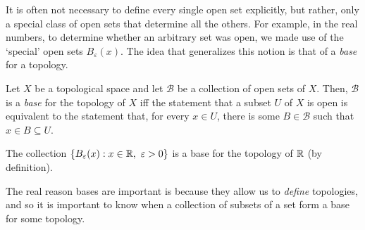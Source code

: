 It is often not necessary to define every single open set explicitly, but rather, only a special class of open sets that determine all the others.  For example, in the real numbers, to determine whether an arbitrary set was open, we made use of the `special' open sets $B_\varepsilon (x)$.  The idea that generalizes this notion is that of a \emph{base} for a topology.
\begin{dfn}[Base]\label{Base}
Let $X$ be a topological space and let $\mathcal{B}$ be a collection of open sets of $X$.  Then, $\mathcal{B}$ is a \emph{base} for the topology of $X$ iff the statement that a subset $U$ of $X$ is open is equivalent to the statement that, for every $x\in U$, there is some $B\in \mathcal{B}$ such that $x\in B\subseteq U$.
\end{dfn}
\begin{exm}
The collection $\left\{ B_\varepsilon (x):x\in \mathbb{R} ,\ \varepsilon >0\right\}$ is a base for the topology of $\mathbb{R}$ (by definition).
\end{exm}
The real reason bases are important is because they allow us to \emph{define} topologies, and so it is important to know when a collection of subsets of a set form a base for some topology.
